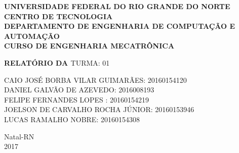 \documentclass[a4paper,12pt]{article}
\begin{document}
\onehalfspacing

\thispagestyle{empty}

\setcounter{page}{1}


\begin{figure}[!ht]

\centering

\hspace{11.09cm}

\label{Logos}

\end{figure}


\vspace{-1cm}

\begin{center}
{\bf{\normalsize UNIVERSIDADE FEDERAL DO RIO GRANDE DO NORTE\\
CENTRO DE TECNOLOGIA\\
DEPARTAMENTO DE ENGENHARIA DE COMPUTAÇÃO E AUTOMAÇÃO\\
CURSO DE ENGENHARIA MECATRÔNICA
}}


\vspace{3.6cm}

{\bf{\large RELATÓRIO DA 
}}
\vspace{1.5cm}
{\large TURMA: 01\\}

\vspace{3.6cm}



\begin{flushright}
\begin{normalsize}
CAIO JOSÉ BORBA VILAR GUIMARÃES:  20160154120 \\
\vspace{0.8cm}
DANIEL GALVÃO DE AZEVEDO: 2016008193 \\
\vspace{0.8cm}
FELIPE FERNANDES LOPES : 20160154219 \\
\vspace{0.8cm}
JOELSON DE CARVALHO ROCHA JÚNIOR: 20160153946\\
\vspace{0.8cm}
 LUCAS RAMALHO NOBRE: 20160154308\\
\end{normalsize}
\end{flushright}


\vspace{2.5cm}

{\large Natal-RN\\
2017}

\end{center}
\end{document}
